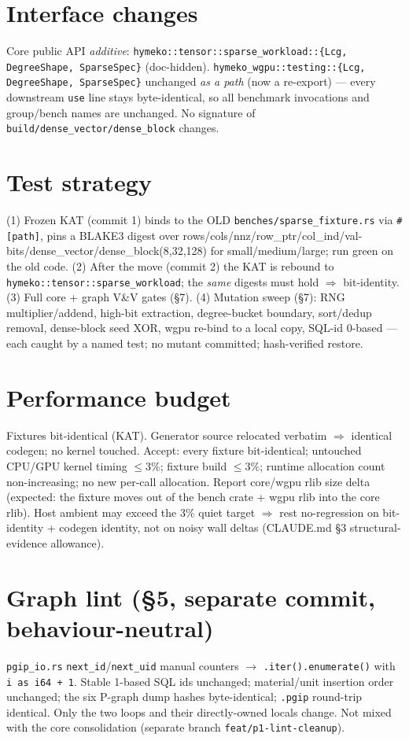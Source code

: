 \documentclass[11pt]{article}
\begin{document}
\section*{Interface changes}
Core public API \emph{additive}: \texttt{hymeko::tensor::sparse\_workload::\{Lcg, DegreeShape, SparseSpec\}}
(doc-hidden). \texttt{hymeko\_wgpu::testing::\{Lcg, DegreeShape, SparseSpec\}} unchanged \emph{as a path}
(now a re-export) --- every downstream \texttt{use} line stays byte-identical, so all benchmark
invocations and group/bench names are unchanged. No signature of \texttt{build/dense\_vector/dense\_block}
changes.

\section*{Test strategy}
(1) Frozen KAT (commit 1) binds to the OLD \texttt{benches/sparse\_fixture.rs} via \texttt{\#[path]}, pins a
BLAKE3 digest over rows/cols/nnz/row\_ptr/col\_ind/val-bits/dense\_vector/dense\_block(8,32,128) for
small/medium/large; run green on the old code. (2) After the move (commit 2) the KAT is rebound to
\texttt{hymeko::tensor::sparse\_workload}; the \emph{same} digests must hold $\Rightarrow$ bit-identity.
(3) Full core + graph V\&V gates (\S7). (4) Mutation sweep (\S7): RNG multiplier/addend, high-bit
extraction, degree-bucket boundary, sort/dedup removal, dense-block seed XOR, wgpu re-bind to a local copy,
SQL-id 0-based --- each caught by a named test; no mutant committed; hash-verified restore.

\section*{Performance budget}
Fixtures bit-identical (KAT). Generator source relocated verbatim $\Rightarrow$ identical codegen; no
kernel touched. Accept: every fixture bit-identical; untouched CPU/GPU kernel timing $\le 3\%$; fixture
build $\le 3\%$; runtime allocation count non-increasing; no new per-call allocation. Report core/wgpu
rlib size delta (expected: the fixture moves out of the bench crate + wgpu rlib into the core rlib). Host
ambient may exceed the 3\% quiet target $\Rightarrow$ rest no-regression on bit-identity + codegen identity,
not on noisy wall deltas (CLAUDE.md \S3 structural-evidence allowance).

\section*{Graph lint (\S5, separate commit, behaviour-neutral)}
\texttt{pgip\_io.rs} \texttt{next\_id}/\texttt{next\_uid} manual counters $\rightarrow$
\texttt{.iter().enumerate()} with \texttt{i as i64 + 1}. Stable 1-based SQL ids unchanged; material/unit
insertion order unchanged; the six P-graph dump hashes byte-identical; \texttt{.pgip} round-trip identical.
Only the two loops and their directly-owned locals change. Not mixed with the core consolidation (separate
branch \texttt{feat/p1-lint-cleanup}).
\end{document}
